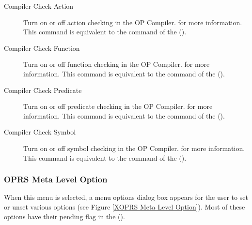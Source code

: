 \begin{description}

\item[Compiler Check Action] Turn on or off action checking in the
OP Compiler.  for more information. This command is
equivalent to the  command of the \CPK{}
().

\item[Compiler Check Function] Turn on or off function checking in the
OP Compiler.  for more information. This command is
equivalent to the  command of the \CPK{}
().

\item[Compiler Check Predicate] Turn on or off predicate checking in the
OP Compiler.  for more information. This command is
equivalent to the  command of the \CPK{}
().

\item[Compiler Check Symbol] Turn on or off symbol checking in the
OP Compiler.  for more information. This command is
equivalent to the  command of the \CPK{}
().

\end{description}

\subsubsection{OPRS Meta Level Option}


When this menu is selected, a menu options dialog box appears for the user to
set or unset various options (see Figure \ref{XOPRS Meta Level Option}). Most of these
options have their pending flag in the \CPK{} ().

